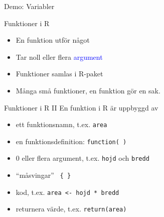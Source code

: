 \documentclass[
  10pt,
  ignorenonframetext,
]{beamer}
\providecommand{\tightlist}{%
  \setlength{\itemsep}{0pt}\setlength{\parskip}{0pt}}
\begin{document}
\begin{frame}{Demo: Variabler}

\end{frame}



\begin{frame}{Funktioner i R}
\protect\hypertarget{funktioner-i-r}{}
\begin{itemize}
\tightlist
\item
  En funktion utför något
\item
  Tar noll eller flera \textcolor{blue}{argument}
\item
  Funktioner samlas i R-paket
\item
  Många små funktioner, en funktion gör en sak.
\end{itemize}
\end{frame}



\begin{frame}{Funktioner i R II}
\protect\hypertarget{funktioner-i-r-ii}{}
En funktion i R är uppbyggd av

\begin{itemize}
\tightlist
\item
  ett funktionsnamn, t.ex. \texttt{area}
\item
  en funktionsdefinition: \texttt{function( )}
\item
  0 eller flera argument, t.ex. \texttt{hojd} och \texttt{bredd}
\item
  ``måsvingar'' \texttt{ \{ \} }
\item
  kod, t.ex. \texttt{area <- hojd * bredd}
\item
  returnera värde, t.ex. \texttt{return(area)}
\end{itemize}
\end{frame}

\end{document}
